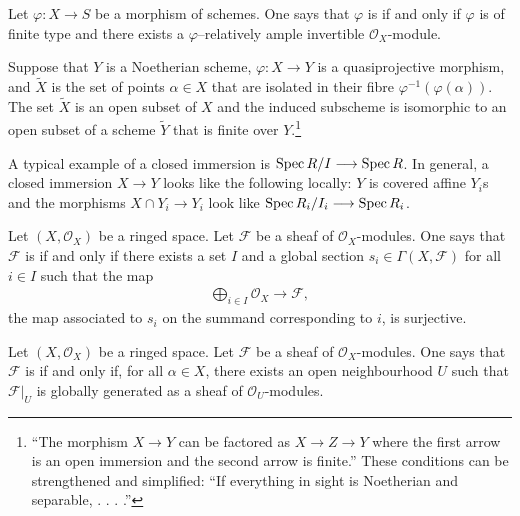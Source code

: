 \documentclass [11 pt, oneside] {article}
\begin{document}
\begin{definition}\label{}\text{}
Let $\varphi : X\longrightarrow S$ be a morphism of schemes. One says that $\varphi$ is  if and only if $\varphi$ is of finite type and there exists a $\varphi$--relatively ample invertible $\mathscr{O}_X$-module.
\end{definition}

\begin{theorem}\label{mtdz}\text{}
Suppose that $Y$ is a Noetherian scheme, $\varphi: X\longrightarrow Y$ is a quasiprojective morphism, and $\tilde X$ is the set of points $\alpha\in X$ that are isolated in their fibre $\varphi^{-1}(\varphi(\alpha))$. The set $\tilde X$ is an open subset of $X$ and the induced subscheme is isomorphic to an open subset of a scheme $\tilde Y$ that is finite over $Y$.\footnote{``The morphism $X\longrightarrow Y$ can be factored as $X\longrightarrow Z\longrightarrow Y$ where the first arrow is an open immersion and the second arrow is finite.'' These conditions can be strengthened and simplified: ``If everything in sight is Noetherian and separable, . . . .''}
\end{theorem}

A typical example of a closed immersion is $\operatorname{Spec} R/I\longrightarrow \operatorname{Spec} R$. In general, a closed immersion $X\longrightarrow Y$ looks like the following locally: $Y$ is covered affine $Y_i$s and the morphisms $X\cap Y_i\longrightarrow Y_i$ look like $\operatorname{Spec} R_i/I_i \longrightarrow \operatorname{Spec} R_i$.

\begin{definition}\label{gensec}\text{}
Let $(X,\mathscr{O}_X)$ be a ringed space. Let $\mathscr{F}$ be a sheaf of $\mathscr{O}_X$-modules. One says that $\mathscr{F}$ is  if and only if there exists a set $I$ and a global section $s_i\in \Gamma(X,\mathscr{F})$ for all $i\in I$ such that the map
\begin{align*}
	\bigoplus_{i\in I}\mathscr{O}_X \longrightarrow \mathscr{F},
\end{align*}
the map associated to $s_i$ on the summand corresponding to $i$, is surjective.
\end{definition}


\begin{definition}\label{}\text{}
Let $(X,\mathscr{O}_X)$ be a ringed space. Let $\mathscr{F}$ be a sheaf of $\mathscr{O}_X$-modules. One says that $\mathscr{F}$ is  if and only if, for all $\alpha\in X$, there exists an open neighbourhood $U$ such that $\mathscr{F}\big |_U$ is globally generated as a sheaf of $\mathscr{O}_U$-modules.
\end{definition}
\end{document}
